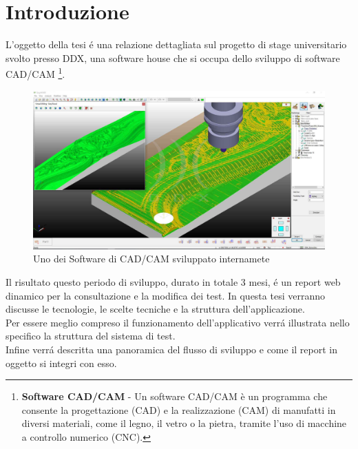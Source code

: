 \chapter{Introduzione}
    L'oggetto della tesi \'e una relazione dettagliata sul progetto di stage universitario svolto presso DDX,
    una software house che si occupa dello sviluppo di software CAD/CAM
    \footnote{\textbf{Software CAD/CAM} - Un software CAD/CAM è un programma che consente la progettazione (CAD)
    e la realizzazione (CAM) di manufatti in diversi materiali, come il legno, il vetro o la pietra, tramite 
    l'uso di macchine a controllo numerico (CNC).}.\\

    \begin{figure}[h]
        \includegraphics[width=\textwidth]{images/easywood.jpg}
        \caption{Uno dei Software di CAD/CAM sviluppato internamete}
    \end{figure}

    Il risultato questo periodo di sviluppo, durato in totale 3 mesi, \'e un report web dinamico per la consultazione e la modifica dei test. 
    In questa tesi verranno discusse le tecnologie, le scelte tecniche e la struttura dell'applicazione.\\

    Per essere meglio compreso il funzionamento dell'applicativo verr\'a illustrata nello specifico la struttura del sistema di test.\\
    Infine verr\'a descritta una panoramica del flusso di sviluppo e come il report in oggetto si integri con esso. \\
